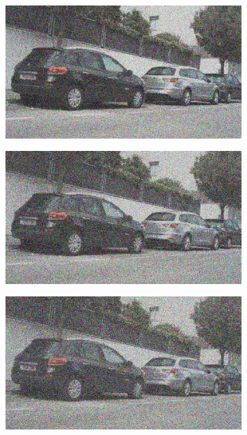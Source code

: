 \documentclass[a4paper]{ctexart}
\begin{document}
\begin{figure}[htbp]
\begin{subfigure}{0.08\textwidth}
			\label{fig：Gamma=0.7, Gauss Noise = 0.4}
		\end{subfigure}
		\begin{subfigure}{0.08\textwidth}
			\captionsetup{font=scriptsize}
			\includegraphics[width=\linewidth]{picture/Edge Detection/degrade/RGB_001 Gamma=0.7, Gauss Noise=0.5}
			\label{fig：Gamma=0.7, Gauss Noise = 0.5}
		\end{subfigure}
		\begin{subfigure}{0.08\textwidth}
			\captionsetup{font=scriptsize}
			\includegraphics[width=\linewidth]{picture/Edge Detection/degrade/RGB_001 Gamma=0.7, Gauss Noise=0.6}
			\label{fig：Gamma=0.7, Gauss Noise = 0.6}
		\end{subfigure}
		\begin{subfigure}{0.08\textwidth}
			\captionsetup{font=scriptsize}
			\includegraphics[width=\linewidth]{picture/Edge Detection/degrade/RGB_001 Gamma=0.7, Gauss Noise=0.7}

\end{subfigure}
\end{figure}
\end{document}
